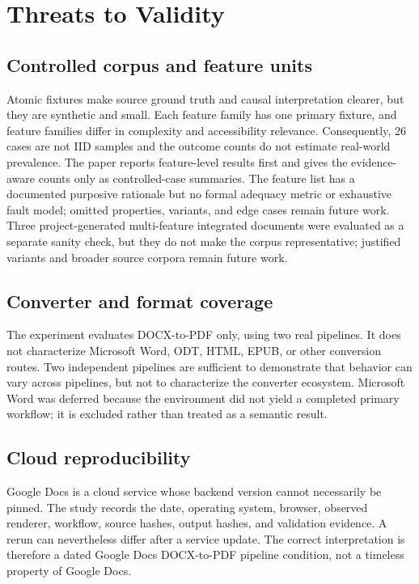 \section{Threats to Validity}
\label{sec:threats}

\subsection{Controlled corpus and feature units}

Atomic fixtures make source ground truth and causal interpretation clearer, but they are synthetic and small. Each feature family has one primary fixture, and feature families differ in complexity and accessibility relevance. Consequently, 26 cases are not IID samples and the outcome counts do not estimate real-world prevalence. The paper reports feature-level results first and gives the evidence-aware counts only as controlled-case summaries. The feature list has a documented purposive rationale but no formal adequacy metric or exhaustive fault model; omitted properties, variants, and edge cases remain future work. Three project-generated multi-feature integrated documents were evaluated as a separate sanity check, but they do not make the corpus representative; justified variants and broader source corpora remain future work.

\subsection{Converter and format coverage}

The experiment evaluates DOCX-to-PDF only, using two real pipelines. It does not characterize Microsoft Word, ODT, HTML, EPUB, or other conversion routes. Two independent pipelines are sufficient to demonstrate that behavior can vary across pipelines, but not to characterize the converter ecosystem. Microsoft Word was deferred because the environment did not yield a completed primary workflow; it is excluded rather than treated as a semantic result.

\subsection{Cloud reproducibility}

Google Docs is a cloud service whose backend version cannot necessarily be pinned. The study records the date, operating system, browser, observed renderer, workflow, source hashes, output hashes, and validation evidence. A rerun can nevertheless differ after a service update. The correct interpretation is therefore a dated Google Docs DOCX-to-PDF pipeline condition, not a timeless property of Google Docs.

